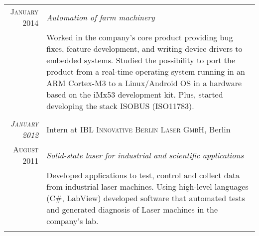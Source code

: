 \documentclass[a4paper,10pt]{article}
\begin{document}
\begin{tabular}{r|p{11cm}}
        \textsc{January 2014}        &\emph
                                     {Automation of farm machinery} \\
                                     &\footnotesize
                                     {
                                         Worked in the company's core product
                                         providing bug fixes, feature
                                         development, and writing device drivers
                                         to embedded systems. Studied the
                                         possibility to port the product from a
                                         real-time operating system running in
                                         an ARM Cortex-M3 to a Linux/Android OS
                                         in a hardware based on the iMx53
                                         development kit. Plus, started
                                         developing the stack ISOBUS (ISO11783).
                                     } \\
                                     \multicolumn{2}{c}{} \\

        \emph{\textsc{January 2012}} & Intern at \textsc
                                     {IBL Innovative Berlin Laser GmbH},
                                     Berlin \\

        \textsc{August 2011}         &\emph
                                     {Solid-state laser for industrial
                                        and scientific applications} \\
                                     &\footnotesize
                                     {
                                         Developed applications to test, control
                                         and collect data from industrial laser
                                         machines. Using high-level languages
                                         (C\#, LabView) developed software that
                                         automated tests and generated diagnosis
                                         of Laser machines in the company's lab.
                                     } \\
                                     \multicolumn{2}{c}{} \\
    \end{tabular}

\end{document}
